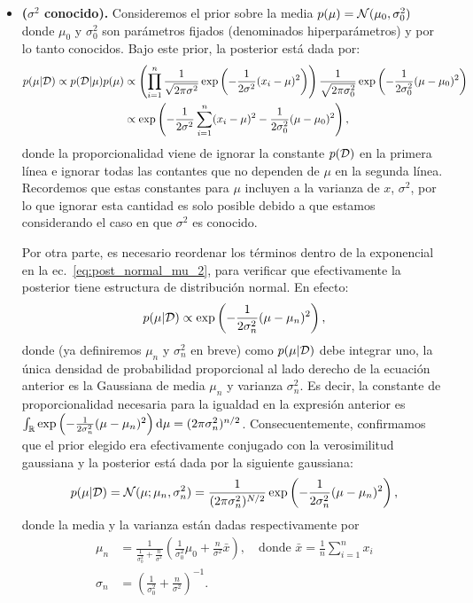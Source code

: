\begin{itemize}
	\item \textbf{($\sigma^2$ conocido).} Consideremos el prior sobre la media $p(\mu) = {\mathcal N}(\mu_0,\sigma_0^2)$ donde $\mu_0$ y $\sigma^2_0$ son parámetros fijados (denominados hiperparámetros) y por lo tanto conocidos. Bajo este prior, la posterior está dada por:
 \begin{align}
 	p(\mu|{\mathcal D}) \propto p({\mathcal D}|\mu)p(\mu) & \propto \left(\prod_{i=1}^n \frac{1}{\sqrt{2\pi\sigma^2}}\exp\left(-\frac{1}{2\sigma^2}(x_i-\mu)^2\right) \right)\frac{1}{\sqrt{2\pi\sigma_0^2}}\exp\left(-\frac{1}{2\sigma_0^2}(\mu-\mu_0)^2\right)\nonumber\\
 	&\propto \exp\left(-\frac{1}{2\sigma^2}\sum_{i=1}^n(x_i-\mu)^2-\frac{1}{2\sigma_0^2}(\mu-\mu_0)^2\right),\label{eq:post_normal_mu_2}
 \end{align} 
 donde la proporcionalidad viene de ignorar la constante $p({\mathcal D})$ en la primera línea e ignorar todas las contantes que no dependen de $\mu$ en la segunda línea. Recordemos que estas constantes para $\mu$ incluyen a la varianza de $x$, $\sigma^2$, por lo que ignorar esta cantidad es solo posible debido a que estamos considerando el caso en que $\sigma^2$ es conocido.
 
 Por otra parte, es necesario reordenar los términos dentro de la exponencial en la ec.~\eqref{eq:post_normal_mu_2}, para verificar que efectivamente la posterior tiene estructura de distribución normal. En efecto:
 \begin{equation}
 	p(\mu|{\mathcal D}) \propto \exp\left(-\frac{1}{2\sigma_n^2}(\mu - \mu_n)^2\right),\label{eq:post_normal_mu_3}
 \end{equation} 
 donde (ya definiremos $\mu_n$ y $\sigma_n^2$ en breve) como $p(\mu|{\mathcal D})$ debe integrar uno, la única densidad de probabilidad proporcional al lado derecho de la ecuación anterior es la Gaussiana de media $\mu_n$ y varianza $\sigma_n^2$. Es decir, la constante de proporcionalidad necesaria para la igualdad en la expresión anterior es $\int_{\mathbb{R}}\exp\left(-\frac{1}{2\sigma_n^2}(\mu - \mu_n)^2\right){\text d}\mu = (2\pi\sigma_n^2)^{n/2}$. Consecuentemente, confirmamos que el prior elegido era efectivamente conjugado con la verosimilitud gaussiana y la posterior está dada por la siguiente gaussiana:
  \begin{equation}
 	p(\mu|{\mathcal D}) = {\mathcal N}(\mu;\mu_n,\sigma_n^2) = \frac{1}{(2\pi\sigma_n^2)^{N/2}}\exp\left(-\frac{1}{2\sigma_n^2}(\mu - \mu_n)^2\right),\label{eq:post_normal_mu_4}
 \end{equation} 
 donde la media y la varianza están dadas respectivamente  por 
 \begin{align}
 	\mu_n &= \frac{1}{\tfrac{1}{\sigma_0^2} + \tfrac{n}{\sigma^2}} \left(\frac{1}{\sigma_0^2}\mu_0 + \frac{n}{\sigma^2}\bar{x} \right), \quad \text{donde } \bar{x} = \frac{1}{n}\sum_{i=1}^n x_i\label{eq:post_Gm}\\
 	\sigma_n &= \left(\frac{1}{\sigma_0^2} + \frac{n}{\sigma^2}\right)^{-1}.\label{eq:post_Gv}
 \end{align}


\end{itemize}
